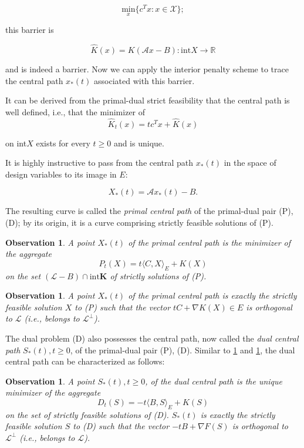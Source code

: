 \documentclass[11pt,a4paper]{article}
\newcommand{\X}{\mathcal{X}}
\newcommand{\R}{\mathbb{R}}
\newtheorem{obs}[thm]{Observation}
\begin{document}
\begin{equation*}
    \underset{x}{\text{min}} \{c^Tx : x \in \X\};
\end{equation*}

this barrier is

\begin{equation*}
    \hat{K}(x) = K(\mathcal{A}x - B) : \text{int}X \to \R
\end{equation*}

and is indeed a barrier. Now we can apply the interior penalty scheme to trace the central path $x_*(t)$ associated with this barrier.

It can be derived from the primal-dual strict feasibility that the central path is well defined, i.e., that the minimizer of
\begin{equation*}
    \hat{K}_t(x)  = tc^Tx+\hat{K}(x)
\end{equation*}

on int$X$ exists for every $t \geq 0$ and is unique.

It is highly instructive to pass from the central path $x_*(t)$ in the space of design variables to its image in $E$:

\[X_*(t) = \mathcal{A}x_*(t)-B.\]

The resulting curve is called the \textit{primal central path} of the primal-dual pair (P), (D); by its origin, it is a curve comprising strictly feasible solutions of (P).

\begin{obs}\label{obs1}
A point $X_*(t)$ of the primal central path is the minimizer of the aggregate
\[P_t(X) = t\langle C, X\rangle_E + K(X)\]
on the set $(\mathcal{L}-B) \cap \text{int}\textbf{K}$ of strictly solutions of (P).
\end{obs}

\begin{obs}\label{obs2}
A point $X_*(t)$ of the primal central path is exactly the strictly feasible solution $X$ to (P) such that the vector $tC+\nabla K(X)\in E$ is orthogonal to $\mathcal{L}$ (i.e., belongs to $\mathcal{L}^\perp$).
\end{obs}

The dual problem (D) also possesses the central path, now called the \textit{dual central path} $S_*(t), t\geq 0$, of the primal-dual pair (P), (D). Similar to \ref{obs1} and \ref{obs2}, the dual central path can be characterized as follows:

\begin{obs}\label{obs3}
A point $S_*(t), t\geq 0$, of the dual central path is the unique minimizer of the aggregate
\[D_t(S) = -t\langle B,S\rangle_E+K(S)\]
on the set of strictly feasible solutions of (D). $S_*(t)$ is exactly the strictly feasible solution $S$ to (D) such that the vector $-tB+\nabla F(S)$ is orthogonal to $\mathcal{L}^\perp$ (i.e., belongs to $\mathcal{L}$).
\end{obs}
\end{document}
